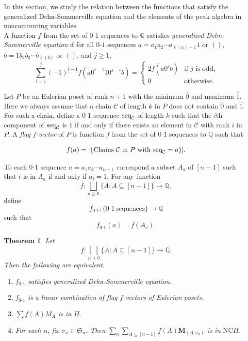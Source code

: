 \documentclass[11pt]{amsart}
\newtheorem{Theorem}{Theorem}[section]
\numberwithin{equation}{section}
\newcommand{\NCPeak}{\mathrm{NC}\Pi}
\newcommand{\bfM}{{\mathbf{M}}}
\begin{document}
In this section, we study the relation between the functions that satisfy the generalized Dehn-Sommerville equation and the elements of the peak algebra in noncommuting variables. \\

A function $f$ from the set of $0\text{-}1$ sequences to $\mathbb{Q}$ 
satisfies \emph{generalized Dehn-Sommerville equation} if for all $0\text{-}1$ sequences $a=a_1a_2\cdots a_{\ell(a)-1}1$ or $()$, $b=1b_2b_3\cdots b_{\ell(b)}$ or $()$, and $j\geq 1$, 
$$\sum_{i=1}^j(-1)^{i-1}f({a0^{i-1}10^{j-i}b})=\begin{cases}
2f({a 0^j b})& \text{if $j$ is odd,}\\
0& \text{otherwise.}
\end{cases}$$




Let $P$ be an Eulerian poset of rank $n+1$ with the minimum $\hat{0}$ and maximum $\hat{1}$. Here we always assume that a chain $\mathcal{C}$ of length $k$ in $P$ does not contain $\hat{0}$ and $\hat{1}$. For such a chain, define a $0\text{-}1$ sequence ${\rm seq}_\mathcal{C}$ of length $k$ such that 
the $i$th component of ${\rm seq}_\mathcal{C}$  is $1$ if and only if there exists an element in $\mathcal{C}$ with rank $i$ in $P$. A \emph{flag $f$-vector} of $P$ is function $f$ from the set of  $0\text{-}1$ sequences to $\mathbb{Q}$ such that   

$$f(a) = |\{\text{Chains $\mathcal{C}$ in $P$ with ${\rm seq}_{\mathcal{C}}=a$}\}|.$$


To each $0\text{-}1$ sequence $a=a_1a_2\cdots a_{n-1}$ correspond a subset $A_a$ of $[n-1]$ such that $i$ is in $A_a$ if and only if $a_i=1$. 
For any function $$f:\bigsqcup_{n\geq 0}\{A: A\subseteq[n-1]\}\to \mathbb{Q},$$ define 
$$f_{0\text{-}1}: \{0\text{-}1~\text{sequences}\} \rightarrow \mathbb{Q}$$ such that 
$$f_{0\text{-}1}(a) = f(A_a).$$


\begin{Theorem}\label{thm:D-S}
 Let $$f:\bigsqcup_{n\geq 0}\{A: A\subseteq[n-1]\}\to \mathbb{Q}.$$ Then the following are equivalent.
 \begin{enumerate}
  \item $f_{0\text{-}1}$ satisfies generalized Dehn-Sommerville equation.
  \item $f_{0\text{-}1}$ is a linear combination of flag $f$-vectors of Eulerian posets.
  \item $\sum f(A)M_A$ is in $\Pi$.
  \item For each $n$, fix $\sigma_n\in\mathfrak{S}_n$. Then $\sum_n\sum_{A\subseteq[n-1]}f(A)\bfM_{(A,\sigma_n)}$ is in $\NCPeak$.
 \end{enumerate}
\end{Theorem}
\end{document}
